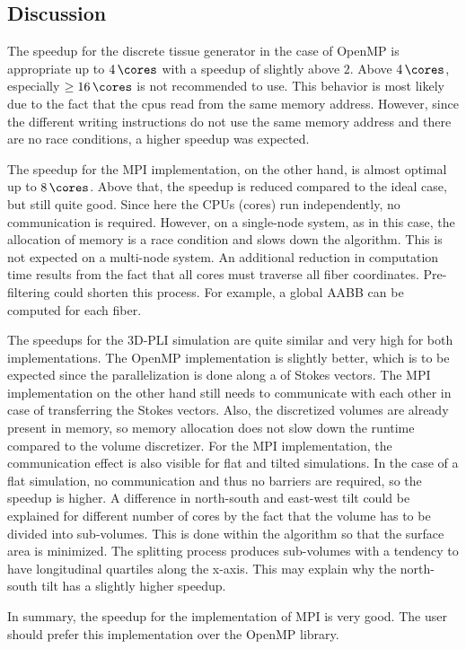 \subsection{Discussion}
%
The speedup for the discrete tissue generator in the case of \ac{OpenMP} is appropriate up to $\SI{4}{\cores}$ with a speedup of slightly above $\num{2}$.
Above $\SI{4}{\cores}$, especially $\geq \SI{16}{\cores}$ is not recommended to use.
This behavior is most likely due to the fact that the cpus read from the same memory address.
However, since the different writing instructions do not use the same memory address and there are no race conditions, a higher speedup was expected.
\par
% 
The speedup for the \ac{MPI} implementation, on the other hand, is almost optimal up to $\SI{8}{\cores}$.
Above that, the speedup is reduced compared to the ideal case, but still quite good.
Since here the \acp{CPU} (cores) run independently, no communication is required.
However, on a single-node system, as in this case, the allocation of memory is a race condition and slows down the algorithm.
This is not expected on a multi-node system.
An additional reduction in computation time results from the fact that all cores must traverse all fiber coordinates.
Pre-filtering could shorten this process.
For example, a global \ac{AABB} can be computed for each fiber.
\par
% 
The speedups for the \ac{3D-PLI} simulation are quite similar and very high for both implementations.
The \ac{OpenMP} implementation is slightly better, which is to be expected since the parallelization is done along a  of Stokes vectors.
The \ac{MPI} implementation on the other hand still needs to communicate with each other in case of transferring the Stokes vectors.
Also, the discretized volumes are already present in memory, so memory allocation does not slow down the runtime compared to the volume discretizer.
For the \ac{MPI} implementation, the communication effect is also visible for flat and tilted simulations.
In the case of a flat simulation, no communication and thus no barriers are required, so the speedup is higher.
A difference in north-south and east-west tilt could be explained for different number of cores by the fact that the volume has to be divided into sub-volumes.
This is done within the algorithm so that the surface area is minimized.
The splitting process produces sub-volumes with a tendency to have longitudinal quartiles along the x-axis.
This may explain why the north-south tilt has a slightly higher speedup.
\par
%
In summary, the speedup for the implementation of \ac{MPI} is very good.
The user should prefer this implementation over the \ac{OpenMP} library.